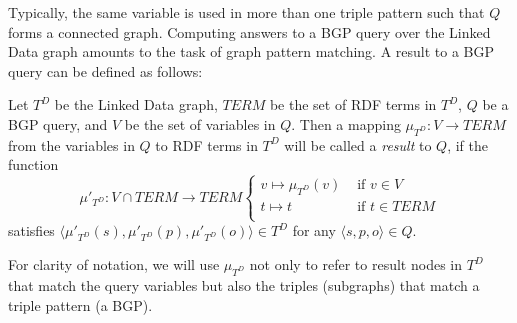 Typically, the same variable is used in more than one triple pattern such that $Q$ forms a connected graph. Computing answers to a BGP query over the Linked Data graph amounts to the
task of graph pattern matching. A result to a BGP query can be defined as
follows:

\begin{definition}[Result]
Let $T^D$ be the Linked Data graph, $TERM$ be the set of RDF terms in $T^D$, $Q$ be a BGP query, and $V$ be the set of variables in $Q$. Then a mapping
$\mu_{T^D}: V \to TERM$ from the variables in $Q$ to RDF terms
in $T^D$ will be called a \emph{result} to $Q$, if the function
\[
\mu'_{T^D}: V \cap TERM \to TERM \left\{
\begin{array}{ll}
v \mapsto \mu_{T^D}(v) & \mbox{ if } v\in V \\
t \mapsto t & \mbox{ if } t \in TERM\\
\end{array}\right.
\]
satisfies $\langle \mu'_{T^D}(s),\mu'_{T^D}(p), \mu'_{T^D}(o) \rangle \in T^D$ for any $\langle s,p,o \rangle \in Q$. 
\end{definition}

For clarity of notation, we will use $\mu_{T^D}$ not only to refer to
result nodes in ${T^D}$ that match the query variables but also the
triples (subgraphs) that match a triple pattern (a BGP).


